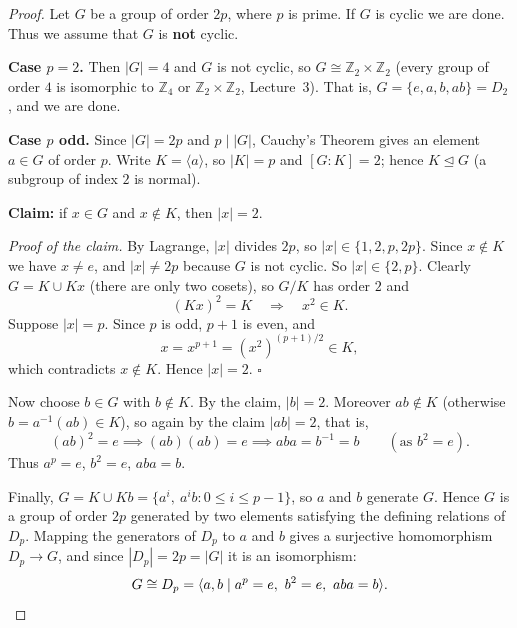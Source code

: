 \documentclass[11pt,a4paper]{article}
\newcommand{\Z}{\mathbb{Z}}
\begin{document}
	\begin{proof}
		Let $G$ be a group of order $2p$, where $p$ is prime. If $G$ is cyclic we are done. Thus we assume that $G$ is \textbf{not} cyclic.
		
		\vspace{0.5em}
		\noindent \textbf{Case $p = 2$.} Then $|G| = 4$ and $G$ is not cyclic, so $G \cong \Z_2 \times \Z_2$ (every group of order $4$ is isomorphic to $\Z_4$ or $\Z_2 \times \Z_2$, Lecture~3). That is, $G = \{e, a, b, ab\} = D_2$, and we are done.
		
		\vspace{0.5em}
		\noindent \textbf{Case $p$ odd.} Since $|G| = 2p$ and $p \mid |G|$, Cauchy's Theorem gives an element $a \in G$ of order $p$. Write $K = \langle a \rangle$, so $|K| = p$ and $[G:K] = 2$; hence $K \trianglelefteq G$ (a subgroup of index $2$ is normal).
		
		\vspace{0.5em}
		\noindent \textbf{Claim:} if $x \in G$ and $x \notin K$, then $|x| = 2$.
		
		\noindent \emph{Proof of the claim.} By Lagrange, $|x|$ divides $2p$, so $|x| \in \{1, 2, p, 2p\}$. Since $x \notin K$ we have $x \neq e$, and $|x| \neq 2p$ because $G$ is not cyclic. So $|x| \in \{2, p\}$. Clearly $G = K \cup Kx$ (there are only two cosets), so $G/K$ has order $2$ and
		\[
		(Kx)^2 = K \quad \Longrightarrow \quad x^2 \in K .
		\]
		Suppose $|x| = p$. Since $p$ is odd, $p + 1$ is even, and
		\[
		x = x^{p+1} = (x^2)^{(p+1)/2} \in K,
		\]
		which contradicts $x \notin K$. Hence $|x| = 2$. \hfill $\square$
		
		\vspace{0.5em}
		\noindent Now choose $b \in G$ with $b \notin K$. By the claim, $|b| = 2$. Moreover $ab \notin K$ (otherwise $b = a^{-1}(ab) \in K$), so again by the claim $|ab| = 2$, that is,
		\[
		(ab)^2 = e \implies (ab)(ab) = e \implies aba = b^{-1} = b \qquad (\text{as } b^2 = e).
		\]
		Thus $a^p = e$, $b^2 = e$, $aba = b$.
		
		\vspace{0.5em}
		\noindent Finally, $G = K \cup Kb = \{a^i,\ a^i b : 0 \le i \le p-1\}$, so $a$ and $b$ generate $G$. Hence $G$ is a group of order $2p$ generated by two elements satisfying the defining relations of $D_p$. Mapping the generators of $D_p$ to $a$ and $b$ gives a surjective homomorphism $D_p \to G$, and since $|D_p| = 2p = |G|$ it is an isomorphism:
		\[
		G \cong D_p = \langle a, b \mid a^p = e,\ b^2 = e,\ aba = b \rangle. \qedhere
		\]
	\end{proof}
	
\end{document}
